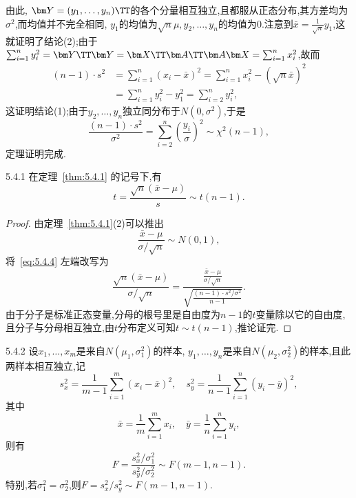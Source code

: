 由此, $\bm Y=(y_1,\dotsc,y_n)\TT$的各个分量相互独立,且都服从正态分布,其方差均为$\sigma^2$,而均值并不完全相同, $y_1$的均值为$\sqrt n\mu,y_2,\dotsc,y_n$的均值为$0$.注意到$\bar x=\frac1{\sqrt n}y_1$,这就证明了结论(2);由于$\sum_{i=1}^ny_i^2=\bm Y\TT\bm Y=\bm X\TT\bm A\TT\bm A\bm X=\sum_{i=1}^nx_i^2$,故而
\begin{align*}
(n-1)\cdot s^2&=\sum_{i=1}^n(x_i-\bar x)^2=\sum_{i=1}^nx_i^2-(\sqrt n\bar x)^2\\
&=\sum_{i=1}^ny_i^2-y_1^2=\sum_{i=2}^ny_i^2,
\end{align*}
这证明结论(1);由于$y_2,\dotsc,y_n$独立同分布于$N(0,\sigma^2)$,于是
\begin{equation}\label{eq:5.4.3}
\frac{(n-1)\cdot s^2}{\sigma^2}=\sum_{i=2}^n\left(\frac{y_i}\sigma\right)^2\sim\chi^2(n-1),
\end{equation}
定理证明完成.
\begin{corollary}{}{5.4.1}
在定理~\ref{thm:5.4.1} 的记号下,有
\begin{equation}\label{eq:5.4.4}
t=\frac{\sqrt n(\bar x-\mu)}s\sim t(n-1).
\end{equation}
\end{corollary}
\begin{proof}
由定理~\ref{thm:5.4.1}(2)可以推出
\begin{equation}\label{eq:5.4.5}
\frac{\bar x-\mu}{\sigma/\sqrt n}\sim N(0,1),
\end{equation}
将~\ref{eq:5.4.4} 左端改写为
\begin{equation}\label{eq:5.4.6}
\frac{\sqrt{n}\left( \bar{x}-\mu \right)}{\sigma /\sqrt{n}}=\frac{\frac{\bar{x}-\mu}{\sigma /\sqrt{n}}}{\sqrt{\frac{\left( n-1 \right) \cdot s^2/\sigma ^2}{n-1}}}.
\end{equation}
由于分子是标准正态变量,分母的根号里是自由度为$n-1$的$t$变量除以它的自由度,且分子与分母相互独立,由$t$分布定义可知$t\sim t(n-1)$,推论证完.
\end{proof}
\begin{corollary}{}{5.4.2}
设$x_1,\dotsc,x_m$是来自$N(\mu_1,\sigma_1^2)$的样本, $y_1,\dotsc,y_n$是来自$N(\mu_2,\sigma_2^2)$的样本,且此两样本相互独立,记
\[s_x^2=\frac1{m-1}\sum_{i=1}^m(x_i-\bar x)^2,\quad s_y^2=\frac1{n-1}\sum_{i=1}^n
(y_i-\bar y)^2,\]
其中
\[\bar x=\frac1m\sum_{i=1}^m x_i,\quad \bar y=\frac1n\sum_{i=1}^ny_i,\]
则有
\begin{equation}\label{eq5.4.7}
F=\frac{s_x^2/\sigma_1^2}{s_y^2/\sigma_2^2}\sim F(m-1,n-1).
\end{equation}
特别,若$\sigma_1^2=\sigma_2^2$,则$F=s_x^2/s_y^2\sim F(m-1,n-1)$.
\end{corollary}
